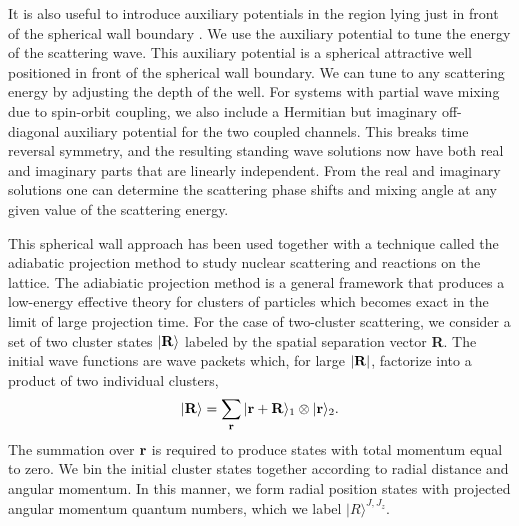 It is also useful to introduce auxiliary potentials in the region lying just in front
of the spherical wall boundary \cite{Lu:2015riz}.  We use the auxiliary potential
to tune the energy of the scattering wave. This auxiliary potential
is a spherical attractive well positioned in front
of the spherical wall boundary.  We can tune to any scattering energy by
adjusting the depth of the well. For systems with partial wave mixing due
to spin-orbit coupling, we also include a Hermitian but imaginary off-diagonal
auxiliary potential
for the two coupled channels.  This breaks time reversal
symmetry, and the resulting standing wave solutions now have both real and imaginary
parts that are linearly independent.  From the real and imaginary solutions
one can determine the scattering phase shifts and mixing angle at any
given value of the scattering energy.

This spherical wall approach has been used together with a technique called the adiabatic projection method to study nuclear scattering and reactions on the lattice.  The adiabiatic projection method \cite{Pine:2013zja,Elhatisari:2014lka,Elhatisari:2015iga,Rokash:2015hra,Elhatisari:2016owd} is a general framework that produces a low-energy effective theory for
clusters of particles which becomes exact in the limit of large projection
time.
For the case of two-cluster scattering, we consider a set of two cluster states
$|{\bf R}\rangle$ labeled by the spatial separation vector {\bf R}. The initial
wave
functions are wave packets which, for large $|{\bf R}|$, factorize into a
product of two
individual clusters,
%
\begin{equation}
|{\bf R}\rangle=\sum_{{\bf r}} |{\bf r}+{\bf R}\rangle_1\otimes|{\bf r}\rangle_2.
\label{eqn:single_clusters}
\end{equation}
%
The summation over $\bf {r}$ is required to produce states with 
total momentum equal to zero. We bin the initial cluster states together
according to radial distance and angular momentum. In this manner, we form
radial 
position states with projected angular momentum quantum numbers, which we
label $|R\rangle^{J,J_z}$. 

